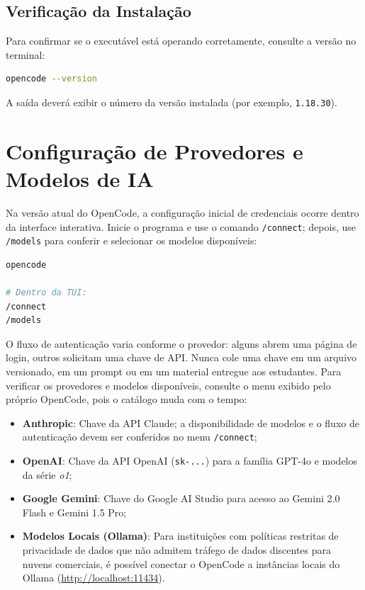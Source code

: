 \subsection{Verifica{\c c}{\~a}o da Instala{\c c}{\~a}o}

Para confirmar se o execut{\'a}vel est{\'a} operando corretamente, consulte a vers{\~a}o no terminal:

\begin{lstlisting}[language=bash]
opencode --version
\end{lstlisting}
A sa{\'i}da dever{\'a} exibir o n{\'u}mero da vers{\~a}o instalada (por exemplo, \texttt{1.18.30}).

\section{Configura{\c c}{\~a}o de Provedores e Modelos de IA}

Na vers{\~a}o atual do OpenCode, a configura{\c c}{\~a}o inicial de credenciais ocorre dentro da interface interativa. Inicie o programa e use o comando \texttt{/connect}; depois, use \texttt{/models} para conferir e selecionar os modelos dispon{\'i}veis:

\begin{lstlisting}[language=bash, caption={Configurando um provedor na interface do OpenCode}]
opencode

# Dentro da TUI:
/connect
/models
\end{lstlisting}

O fluxo de autentica{\c c}{\~a}o varia conforme o provedor: alguns abrem uma p{\'a}gina de login, outros solicitam uma chave de API. Nunca cole uma chave em um arquivo versionado, em um prompt ou em um material entregue aos estudantes. Para verificar os provedores e modelos dispon{\'i}veis, consulte o menu exibido pelo pr{\'o}prio OpenCode, pois o cat{\'a}logo muda com o tempo:
\begin{itemize}
  \item \textbf{Anthropic}: Chave da API Claude; a disponibilidade de modelos e o fluxo de autentica{\c c}{\~a}o devem ser conferidos no menu \texttt{/connect};
  \item \textbf{OpenAI}: Chave da API OpenAI (\texttt{sk-...}) para a fam{\'i}lia GPT-4o e modelos da s{\'e}rie \emph{o1};
  \item \textbf{Google Gemini}: Chave do Google AI Studio para acesso ao Gemini 2.0 Flash e Gemini 1.5 Pro;
  \item \textbf{Modelos Locais (Ollama)}: Para institui{\c c}{\~o}es com pol{\'i}ticas restritas de privacidade de dados que n{\~a}o admitem tr{\'a}fego de dados discentes para nuvens comerciais, {\'e} poss{\'i}vel conectar o OpenCode a inst{\^a}ncias locais do Ollama (\url{http://localhost:11434}).
\end{itemize}

